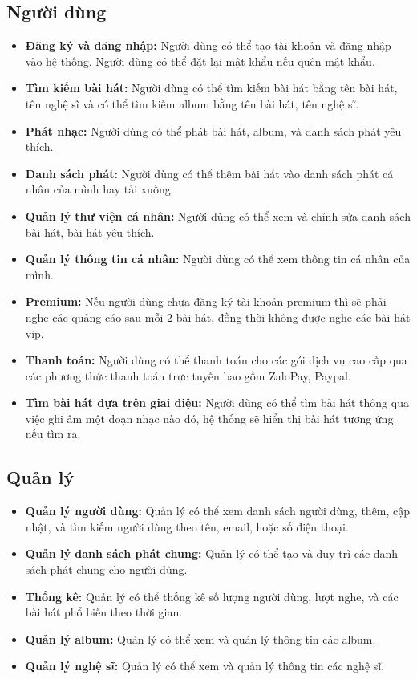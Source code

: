 \subsection{Người dùng}
\begin{itemize}
    \item \textbf{Đăng ký và đăng nhập:} Người dùng có thể tạo tài khoản và đăng nhập vào hệ thống. Người dùng có thể đặt lại mật khẩu nếu quên mật khẩu.
    \item \textbf{Tìm kiếm bài hát:} Người dùng có thể tìm kiếm bài hát bằng tên bài hát, tên nghệ sĩ và có thể tìm kiếm album bằng tên bài hát, tên nghệ sĩ.
    \item \textbf{Phát nhạc:} Người dùng có thể phát bài hát, album, và danh sách phát yêu thích.
    \item \textbf{Danh sách phát:} Người dùng có thể thêm bài hát vào danh sách phát cá nhân của mình hay tải xuống.
    \item \textbf{Quản lý thư viện cá nhân:} Người dùng có thể xem và chỉnh sửa danh sách bài hát, bài hát yêu thích.
    \item \textbf{Quản lý thông tin cá nhân:} Người dùng có thể xem thông tin cá nhân của mình.
    \item \textbf{Premium:} Nếu người dùng chưa đăng ký tài khoản premium thì sẽ phải nghe các quảng cáo sau mỗi 2 bài hát, đồng thời không được nghe các bài hát vip.
    \item \textbf{Thanh toán:} Người dùng có thể thanh toán cho các gói dịch vụ cao cấp qua các phương thức thanh toán trực tuyến bao gồm ZaloPay, Paypal.
    \item \textbf{Tìm bài hát dựa trên giai điệu:} Người dùng có thể tìm bài hát thông qua việc ghi âm một đoạn nhạc nào đó, hệ thống sẽ hiển thị bài hát tương ứng nếu tìm ra.
\end{itemize}

\subsection{Quản lý}
\begin{itemize}
    \item \textbf{Quản lý người dùng:} Quản lý có thể xem danh sách người dùng, thêm, cập nhật, và tìm kiếm người dùng theo tên, email, hoặc số điện thoại.
    \item \textbf{Quản lý danh sách phát chung:} Quản lý có thể tạo và duy trì các danh sách phát chung cho người dùng.
    \item \textbf{Thống kê:} Quản lý có thể thống kê số lượng người dùng, lượt nghe, và các bài hát phổ biến theo thời gian.
    \item \textbf{Quản lý album:} Quản lý có thể xem và quản lý thông tin các album.
    \item \textbf{Quản lý nghệ sĩ:} Quản lý có thể xem và quản lý thông tin các nghệ sĩ.
\end{itemize}
